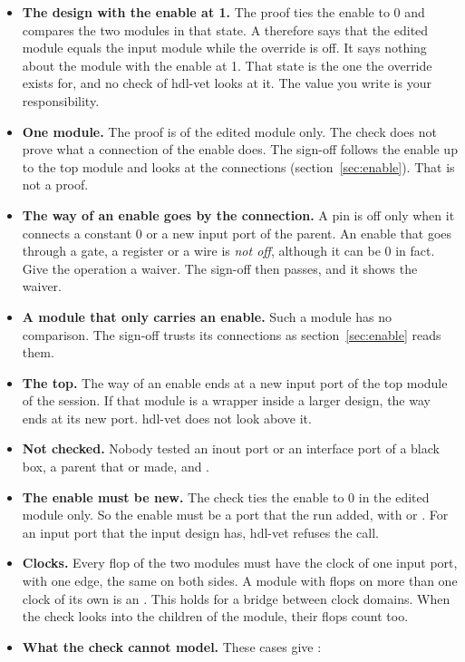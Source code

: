 \begin{itemize}
\item \textbf{The design with the enable at 1.} The proof ties the enable to 0 and compares
  the two modules in that state. A  therefore says that the edited module
  equals the input module while the override is off. It says nothing about the module with
  the enable at 1. That state is the one the override exists for, and no check of hdl-vet
  looks at it. The value you write is your responsibility.
\item \textbf{One module.} The proof is of the edited module only. The check does not
  prove what a connection of the enable does. The sign-off follows the enable up to the top
  module and looks at the connections (section~\ref{sec:enable}). That is not a proof.
\item \textbf{The way of an enable goes by the connection.} A pin is off only when it
  connects a constant 0 or a new input port of the parent. An enable that goes through a
  gate, a register or a wire is \emph{not off}, although it can be 0 in fact. Give the
  operation a waiver. The sign-off then passes, and it shows the waiver.
\item \textbf{A module that only carries an enable.} Such a module has no comparison. The
  sign-off trusts its connections as section~\ref{sec:enable} reads them.
\item \textbf{The top.} The way of an enable ends at a new input port of the top module of
  the session. If that module is a wrapper inside a larger design, the way ends at its new
  port. hdl-vet does not look above it.
\item \textbf{Not checked.} Nobody tested an inout port or an interface port of a black
  box, a parent that  or  made, and
  .
\item \textbf{The enable must be new.} The check ties the enable to 0 in the edited module
  only. So the enable must be a port that the run added, with  or
  . For an input port that the input design has, hdl-vet refuses
  the call.
\item \textbf{Clocks.} Every flop of the two modules must have the clock of one input
  port, with one edge, the same on both sides. A module with flops on more than one clock
  of its own is an . This holds for a bridge between clock domains. When the
  check looks into the children of the module, their flops count too.
\item \textbf{What the check cannot model.} These cases give :

\end{itemize}
